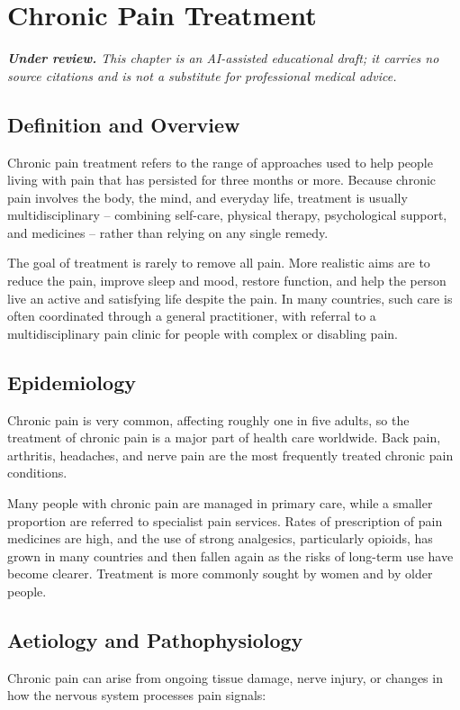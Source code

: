 \chapter{Chronic Pain Treatment}

\medskip
\noindent\textit{\textbf{Under review.} This chapter is an AI-assisted educational draft; it carries no source citations and is not a substitute for professional medical advice.}

\section*{Definition and Overview}
Chronic pain treatment refers to the range of approaches used to help people living with pain that has persisted for three months or more. Because chronic pain involves the body, the mind, and everyday life, treatment is usually multidisciplinary -- combining self-care, physical therapy, psychological support, and medicines -- rather than relying on any single remedy.

The goal of treatment is rarely to remove all pain. More realistic aims are to reduce the pain, improve sleep and mood, restore function, and help the person live an active and satisfying life despite the pain. In many countries, such care is often coordinated through a general practitioner, with referral to a multidisciplinary pain clinic for people with complex or disabling pain.

\section*{Epidemiology}
Chronic pain is very common, affecting roughly one in five adults, so the treatment of chronic pain is a major part of health care worldwide. Back pain, arthritis, headaches, and nerve pain are the most frequently treated chronic pain conditions.

Many people with chronic pain are managed in primary care, while a smaller proportion are referred to specialist pain services. Rates of prescription of pain medicines are high, and the use of strong analgesics, particularly opioids, has grown in many countries and then fallen again as the risks of long-term use have become clearer. Treatment is more commonly sought by women and by older people.

\section*{Aetiology and Pathophysiology}
Chronic pain can arise from ongoing tissue damage, nerve injury, or changes in how the nervous system processes pain signals:

